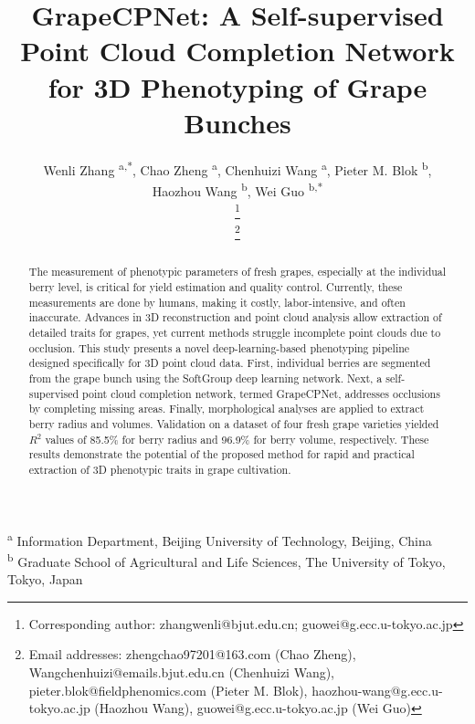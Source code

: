 \documentclass[12pt]{article}
\newcommand\blfootnote[1]{
    \begingroup
    \renewcommand\thefootnote{}\footnote{#1}
    \addtocounter{footnote}{-1}
    \endgroup
}
\begin{document}
\title{GrapeCPNet: A Self-supervised Point Cloud Completion Network for 3D Phenotyping of Grape Bunches}
\author{
    Wenli Zhang \textsuperscript{a,*},
    Chao Zheng \textsuperscript{a},
    Chenhuizi Wang \textsuperscript{a},
    Pieter M. Blok \textsuperscript{b}, \\
    Haozhou Wang \textsuperscript{b},
    Wei Guo \textsuperscript{b,*}
    \blfootnote{Corresponding author: zhangwenli@bjut.edu.cn; guowei@g.ecc.u-tokyo.ac.jp }
    \blfootnote{Email addresses: zhengchao97201@163.com (Chao Zheng), Wangchenhuizi@emails.bjut.edu.cn (Chenhuizi Wang), pieter.blok@fieldphenomics.com (Pieter M. Blok), haozhou-wang@g.ecc.u-tokyo.ac.jp (Haozhou Wang), guowei@g.ecc.u-tokyo.ac.jp (Wei Guo)}
}
\date{}

\maketitle

\noindent\textsuperscript{a} Information Department, Beijing University of Technology, Beijing, China \\
\textsuperscript{b} Graduate School of Agricultural and Life Sciences, The University of Tokyo, Tokyo, Japan\\

\begin{abstract}
The measurement of phenotypic parameters of fresh grapes, especially at the individual berry level, is critical for yield estimation and quality control. 
Currently, these measurements are done by humans, making it costly, labor-intensive, and often inaccurate. 
Advances in 3D reconstruction and point cloud analysis allow extraction of detailed traits for grapes, yet current methods struggle incomplete point clouds due to occlusion. 
This study presents a novel deep-learning-based phenotyping pipeline designed specifically for 3D point cloud data.                                                         
First, individual berries are segmented from the grape bunch using the SoftGroup deep learning network. 
Next, a self-supervised point cloud completion network, termed GrapeCPNet, addresses occlusions by completing missing areas.  
Finally, morphological analyses are applied to extract berry radius and volumes. 
Validation on a dataset of four fresh grape varieties yielded  $R^2$ values of 85.5\% for berry radius and 96.9\% for berry volume, respectively. 
These results demonstrate the potential of the proposed method for rapid and practical extraction of 3D phenotypic traits in grape cultivation.
\end{abstract}
\end{document}
